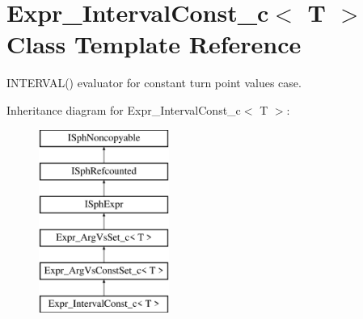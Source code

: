 \hypertarget{classExpr__IntervalConst__c}{\section{Expr\-\_\-\-Interval\-Const\-\_\-c$<$ T $>$ Class Template Reference}
\label{classExpr__IntervalConst__c}
}


I\-N\-T\-E\-R\-V\-A\-L() evaluator for constant turn point values case.  


Inheritance diagram for Expr\-\_\-\-Interval\-Const\-\_\-c$<$ T $>$\-:\begin{figure}[H]
\begin{center}
\leavevmode
\includegraphics[height=6.000000cm]{classExpr__IntervalConst__c}
\end{center}
\end{figure}
